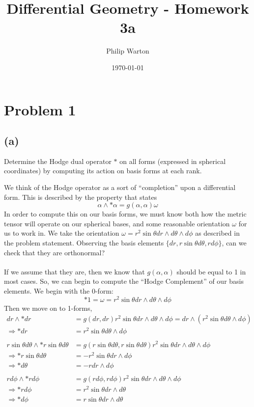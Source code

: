 \documentclass{article}
\theoremstyle{definition}
\begin{document}
\title{Differential Geometry - Homework 3a}
\author{Philip Warton}
\date{\today}
\maketitle
\section*{Problem 1}
\subsection*{(a)}
\begin{mdframed}
    Determine the Hodge dual operator $*$ on all forms (expressed in spherical coordinates)
    by computing its action on basis forms at each rank. 
\end{mdframed}
We think of the Hodge operator as a sort of ``completion'' upon a differential form. This is 
described by the property that states
\[
    \alpha \wedge * \alpha = g(\alpha, \alpha) \omega
\]
In order to compute this on our basis forms, we must know both how the metric tensor will operate on
our spherical bases, and some reasonable orientation $\omega$ for us to work in. We take the orientation
$\omega = r^2 \sin \theta dr \wedge d \theta \wedge d \phi$ as described in the problem statement.
Observing the basis elements $\{dr, r \sin \theta d\theta, r d\phi\}$, can we check that they are orthonormal?
\\\\
If we assume that they are, then we know that $g(\alpha, \alpha)$ should be equal to 1 in most cases.
So, we can begin to compute the ``Hodge Complement'' of our basis elements. We begin with the 0-form:
\[
    *1 = \omega = r^2\sin \theta dr \wedge d \theta \wedge d \phi
\]
Then we move on to 1-forms,
\begin{align*}
    dr \wedge *dr &= g(dr, dr) r^2\sin\theta dr \wedge d \theta \wedge d\phi = dr \wedge (r^2\sin\theta d\theta \wedge d\phi) \\
    \Longrightarrow *dr & = r^2\sin\theta d\theta \wedge d\phi \\\\
    r\sin \theta d\theta \wedge * r\sin\theta d\theta &= g(r\sin\theta d\theta,r\sin\theta d\theta) r^2 \sin\theta dr\wedge d\theta\wedge d\phi\\
    \Longrightarrow *r\sin\theta d\theta &= -r^2\sin\theta dr \wedge d\phi \\
    \Longrightarrow *d\theta &= -r dr \wedge d\phi \\\\
    rd\phi \wedge * rd\phi &= g(rd\phi, rd\phi)r^2\sin\theta dr\wedge d\theta\wedge d\phi \\
    \Longrightarrow *rd\phi &= r^2 \sin \theta dr \wedge d\theta \\
    \Longrightarrow *d\phi &= r \sin\theta dr \wedge d\theta \\\\
\end{align*}
\end{document}
